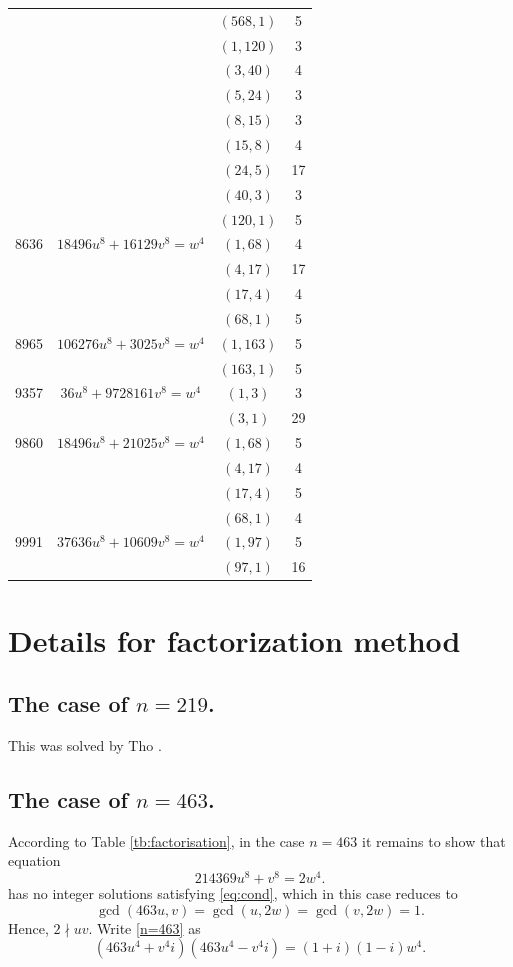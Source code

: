 \documentclass[a4paper,12pt,english,reqno]{amsart}
\begin{document}
\begin{center}
\begin{longtable}{|c|c|c|c|}
&& $(568,1)$ & 5 \\
&& $(1,120)$ & 3 \\
&& $(3,40)$ & 4 \\
&& $(5,24)$ & 3 \\
&& $(8,15)$ & 3 \\
&& $(15,8)$ & 4 \\
&& $(24,5)$ & 17 \\
&& $(40,3)$ & 3 \\
&& $(120,1)$ & 5  \\\hline
8636& $18496 u^8 + 16129 v^8 = w^4$ & $(1,68)$ & 4 \\
&& $(4,17)$ & 17 \\
&& $(17,4)$ & 4 \\
&& $(68,1)$ & 5 \\\hline
8965 & $106276 u^8 + 3025 v^8 = w^4$ & $(1,163)$ & 5 \\
&& $(163,1)$ & 5 \\\hline
9357 & $36 u^8+ 9728161 v^8 = w^4$ & $(1,3)$ & 3 \\
&& $(3,1)$ & 29 \\\hline
9860 & $18496 u^8 +  21025 v^8 = w^4$ & $(1,68)$ & 5 \\
&& $(4,17)$ & 4 \\
&& $(17,4)$ & 5 \\
&& $(68,1)$ & 4 \\\hline
9991 & $37636u^8+10609v^8 = w^4$ & $(1,97)$ & 5 \\
&& $(97,1)$ & 16 \\
\end{longtable}
\end{center}


\section{Details for factorization method}\label{AppendixB}
\subsection{The case of $n=219$.} %
This was solved by Tho \cite{THO2026125764}. 

\subsection{The case of $n=463$.}%
 According to Table \ref{tb:factorisation}, in the case $n=463$ it remains to
show that equation
\begin{equation}\label{n=463}
214369 u^8 + v^8=2 w^4.
\end{equation}
has no integer solutions satisfying \eqref{eq:cond}, which in this case reduces to
\[\gcd(463u,v)=\gcd(u,2w)=\gcd(v,2w)=1.\]
Hence, $2\nmid uv$.  
Write \eqref{n=463} as 
\begin{equation}\label{463.1} (463u^4+v^4i)(463u^4-v^4i)=(1+i)(1-i)w^4.
\end{equation}
\end{document}
